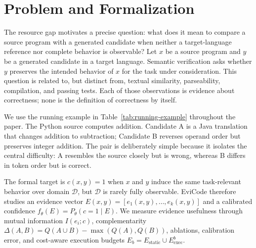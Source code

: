 ﻿\documentclass[conference]{IEEEtran}
\begin{document}
\section{Problem and Formalization}
The resource gap motivates a precise question: what does it mean to compare a source program with a generated candidate when neither a target-language reference nor complete behavior is observable?
Let $x$ be a source program and $y$ be a generated candidate in a target language. Semantic verification asks whether $y$ preserves the intended behavior of $x$ for the task under consideration. This question is related to, but distinct from, textual similarity, parseability, compilation, and passing tests. Each of those observations is evidence about correctness; none is the definition of correctness by itself.

We use the running example in Table~\ref{tab:running-example} throughout the paper. The Python source computes addition. Candidate A is a Java translation that changes addition to subtraction; Candidate B reverses operand order but preserves integer addition. The pair is deliberately simple because it isolates the central difficulty: A resembles the source closely but is wrong, whereas B differs in token order but is correct.

\begin{table}[!htbp]
\centering
\caption{Running example used to explain how evidence sources distinguish resemblance from semantic consistency.}
\label{tab:running-example}
\footnotesize
{}
\vspace{0.5em}
\end{table}

The formal target is $c(x,y)=1$ when $x$ and $y$ induce the same task-relevant behavior over domain $\mathcal{D}$, but $\mathcal{D}$ is rarely fully observable. EviCode therefore studies an evidence vector $E(x,y)=[e_1(x,y),\ldots,e_k(x,y)]$ and a calibrated confidence $f_\theta(E)=P_\theta(c=1\mid E)$. We measure evidence usefulness through mutual information $I(e_i;c)$, complementarity $\Delta(A,B)=Q(A\cup B)-\max(Q(A),Q(B))$, ablations, calibration error, and cost-aware execution budgets $E_b=E_{\mathrm{static}}\cup E_{\mathrm{exec}}^b$.
\end{document}
